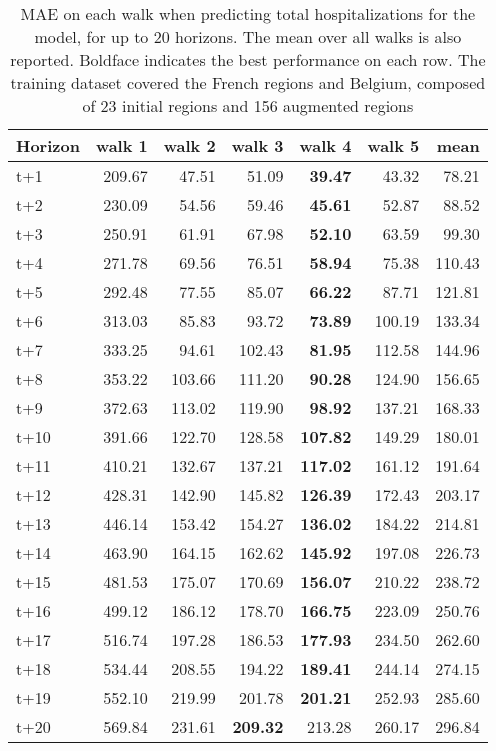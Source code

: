 \begin{table}[H]
\centering
\caption{MAE on each walk when predicting total hospitalizations for the model, for up to 20 horizons. The mean over all walks is also reported. Boldface indicates the best performance on each row. The training dataset covered the French regions and Belgium, composed of 23 initial regions and 156 augmented regions }
\label{tab:MAE_walk_custom_linear_regression}
\begin{tabular}{lrrrrrr}
\toprule
Horizon &  walk 1 &  walk 2 &  walk 3 &  walk 4 &  walk 5 &   mean \\
\midrule
t+1  & 209.67  & 47.51  & 51.09  & \textbf{39.47}  & 43.32  & 78.21  \\
t+2  & 230.09  & 54.56  & 59.46  & \textbf{45.61}  & 52.87  & 88.52  \\
t+3  & 250.91  & 61.91  & 67.98  & \textbf{52.10}  & 63.59  & 99.30  \\
t+4  & 271.78  & 69.56  & 76.51  & \textbf{58.94}  & 75.38  & 110.43  \\
t+5  & 292.48  & 77.55  & 85.07  & \textbf{66.22}  & 87.71  & 121.81  \\
t+6  & 313.03  & 85.83  & 93.72  & \textbf{73.89}  & 100.19  & 133.34  \\
t+7  & 333.25  & 94.61  & 102.43  & \textbf{81.95}  & 112.58  & 144.96  \\
t+8  & 353.22  & 103.66  & 111.20  & \textbf{90.28}  & 124.90  & 156.65  \\
t+9  & 372.63  & 113.02  & 119.90  & \textbf{98.92}  & 137.21  & 168.33  \\
t+10  & 391.66  & 122.70  & 128.58  & \textbf{107.82}  & 149.29  & 180.01  \\
t+11  & 410.21  & 132.67  & 137.21  & \textbf{117.02}  & 161.12  & 191.64  \\
t+12  & 428.31  & 142.90  & 145.82  & \textbf{126.39}  & 172.43  & 203.17  \\
t+13  & 446.14  & 153.42  & 154.27  & \textbf{136.02}  & 184.22  & 214.81  \\
t+14  & 463.90  & 164.15  & 162.62  & \textbf{145.92}  & 197.08  & 226.73  \\
t+15  & 481.53  & 175.07  & 170.69  & \textbf{156.07}  & 210.22  & 238.72  \\
t+16  & 499.12  & 186.12  & 178.70  & \textbf{166.75}  & 223.09  & 250.76  \\
t+17  & 516.74  & 197.28  & 186.53  & \textbf{177.93}  & 234.50  & 262.60  \\
t+18  & 534.44  & 208.55  & 194.22  & \textbf{189.41}  & 244.14  & 274.15  \\
t+19  & 552.10  & 219.99  & 201.78  & \textbf{201.21}  & 252.93  & 285.60  \\
t+20  & 569.84  & 231.61  & \textbf{209.32}  & 213.28  & 260.17  & 296.84  \\

\bottomrule
\end{tabular}
\end{table}
